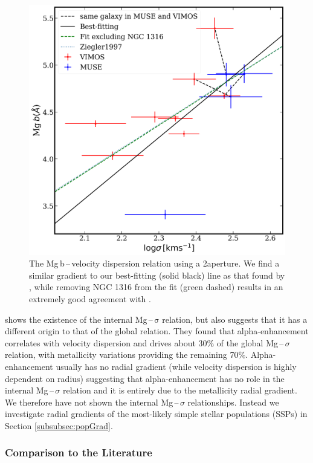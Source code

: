 			\begin{figure}
				\centering
				\includegraphics[width=.8\textwidth]{chapter4/Mg_sigma.png}
				\caption[Global Mg\,b\,--\,$\sigma$]{The Mg\,b\,--\,velocity dispersion relation using a 2\arcsec aperture. We find a similar gradient to our best-fitting (solid black) line as that found by \citet[; blue dotted line]{Ziegler1997}, while removing NGC 1316 from the fit (green dashed) results in an extremely good agreement with \citet{Ziegler1997}.}
				\label{fig:globalMg}
			\end{figure}

			\citet{Mehlert2003} shows the existence of the internal Mg\,--\,$\mathrm{\sigma}$ relation, but also suggests that it has a different origin to that of the global relation. They found that alpha-enhancement correlates with velocity dispersion and drives about 30\% of the global Mg\,--\,$\sigma$ relation, with metallicity variations providing the remaining 70\%. Alpha-enhancement usually has no radial gradient (while velocity dispersion is highly dependent on radius) suggesting that alpha-enhancement has no role in the internal Mg\,--\,$\sigma$ relation and it is entirely due to the metallicity radial gradient. We therefore have not shown the internal Mg\,--\,$\sigma$ relationships. Instead we investigate radial gradients of the most-likely simple stellar populations (SSPs) in Section \ref{subsubsec:popGrad}.


		\subsubsection{Comparison to the Literature}
			\label{subsubsec:Lit}

